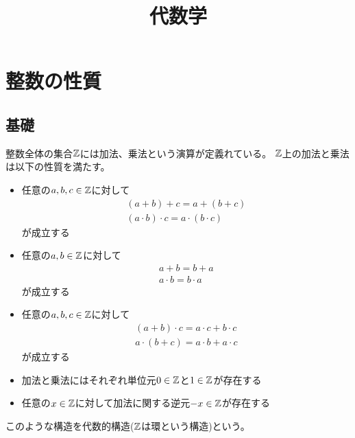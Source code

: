 \documentclass[uplatex, 11pt, a4j, dvipdfmx]{jsarticle}
\title{代数学}
\author{}
\date{}
\begin{document}
\maketitle

\section{整数の性質}
  \subsection{基礎}
    整数全体の集合$\mathbb{Z}$には加法、乗法という演算が定義れている。
    $\mathbb{Z}$上の加法と乗法は以下の性質を満たす。
    \begin{itemize}
      \item 任意の$a, b, c \in \mathbb{Z}$に対して
            \begin{equation} \begin{gathered}
              ( a + b ) + c = a + ( b + c ) \\
              ( a \cdot b ) \cdot c = a \cdot ( b \cdot c )
            \end{gathered} \end{equation}
            が成立する
      \item 任意の$a, b \in \mathbb{Z}$に対して
            \begin{equation} \begin{gathered}
              a + b = b + a \\
              a \cdot b = b \cdot a
            \end{gathered} \end{equation}
            が成立する
      \item 任意の$a, b, c \in \mathbb{Z}$に対して
            \begin{equation} \begin{gathered}
              ( a + b ) \cdot c = a \cdot c + b \cdot c \\
              a \cdot ( b + c ) = a \cdot b + a \cdot c
            \end{gathered} \end{equation}
            が成立する
      \item 加法と乗法にはそれぞれ単位元$0 \in \mathbb{Z}$と$1 \in \mathbb{Z}$が存在する
      \item 任意の$x \in \mathbb{Z}$に対して加法に関する逆元$-x \in \mathbb{Z}$が存在する
    \end{itemize}

    このような構造を代数的構造($\mathbb{Z}$は環という構造)という。
\end{document}
